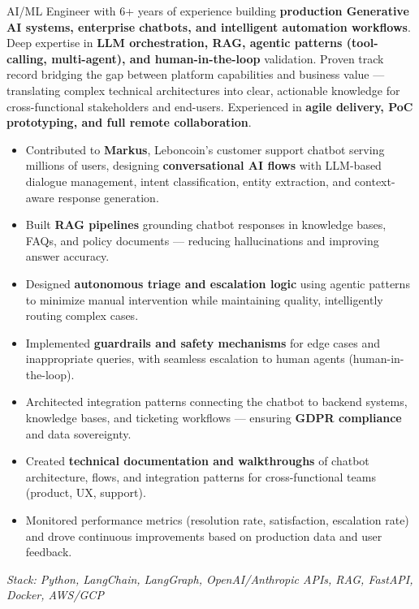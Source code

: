 \documentclass[10pt,a4paper]{altacv}
\begin{document}


\begin{fullwidth}
\makecvheader
\end{fullwidth}


AI/ML Engineer with 6+ years of experience building \textbf{production Generative AI systems, enterprise chatbots, and intelligent automation workflows}. Deep expertise in \textbf{LLM orchestration, RAG, agentic patterns (tool-calling, multi-agent), and human-in-the-loop} validation. Proven track record bridging the gap between platform capabilities and business value — translating complex technical architectures into clear, actionable knowledge for cross-functional stakeholders and end-users. Experienced in \textbf{agile delivery, PoC prototyping, and full remote collaboration}.


\begin{itemize}
  \item Contributed to \textbf{Markus}, Leboncoin's customer support chatbot serving millions of users, designing \textbf{conversational AI flows} with LLM-based dialogue management, intent classification, entity extraction, and context-aware response generation.
  \item Built \textbf{RAG pipelines} grounding chatbot responses in knowledge bases, FAQs, and policy documents — reducing hallucinations and improving answer accuracy.
  \item Designed \textbf{autonomous triage and escalation logic} using agentic patterns to minimize manual intervention while maintaining quality, intelligently routing complex cases.
  \item Implemented \textbf{guardrails and safety mechanisms} for edge cases and inappropriate queries, with seamless escalation to human agents (human-in-the-loop).
  \item Architected integration patterns connecting the chatbot to backend systems, knowledge bases, and ticketing workflows — ensuring \textbf{GDPR compliance} and data sovereignty.
  \item Created \textbf{technical documentation and walkthroughs} of chatbot architecture, flows, and integration patterns for cross-functional teams (product, UX, support).
  \item Monitored performance metrics (resolution rate, satisfaction, escalation rate) and drove continuous improvements based on production data and user feedback.
\end{itemize}
\textit{Stack: Python, LangChain, LangGraph, OpenAI/Anthropic APIs, RAG, FastAPI, Docker, AWS/GCP}
\end{document}
